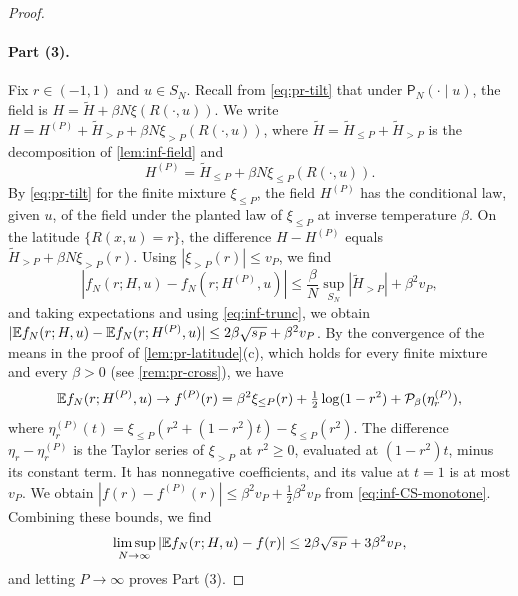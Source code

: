 \begin{proof}
\paragraph{Part (3).} Fix $r\in(-1,1)$ and $u\in S_N$. Recall from \eqref{eq:pr-tilt} that under $\mathsf P_N(\cdot\mid u)$, the field is $H=\widetilde H+\beta N\xi(R(\cdot,u))$. We write $H=H^{(P)}+\widetilde H_{>P}+\beta N\xi_{>P}(R(\cdot,u))$, where $\widetilde H=\widetilde H_{\le P}+\widetilde H_{>P}$ is the decomposition of \cref{lem:inf-field} and
\begin{equation*}
H^{(P)}=\widetilde H_{\le P}+\beta N\xi_{\le P}(R(\cdot,u)).
\end{equation*}
By \eqref{eq:pr-tilt} for the finite mixture $\xi_{\le P}$, the field $H^{(P)}$ has the conditional law, given $u$, of the field under the planted law of $\xi_{\le P}$ at inverse temperature $\beta$. On the latitude $\{R(x,u)=r\}$, the difference $H-H^{(P)}$ equals $\widetilde H_{>P}+\beta N\xi_{>P}(r)$. Using $|\xi_{>P}(r)|\le v_P$, we find
\begin{equation*}
|f_N(r;H,u)-f_N(r;H^{(P)},u)|\le\frac\beta N\sup_{S_N}|\widetilde H_{>P}|+\beta^2v_P,
\end{equation*}
and taking expectations and using \eqref{eq:inf-trunc}, we obtain $|\mathbb E f_N(r;H,u)-\mathbb E f_N(r;H^{(P)},u)|\le2\beta\sqrt{s_P}+\beta^2v_P$. By the convergence of the means in the proof of \cref{lem:pr-latitude}(c), which holds for every finite mixture and every $\beta>0$ (see \cref{rem:pr-cross}), we have
\begin{equation*}
\mathbb E f_N(r;H^{(P)},u)\to f^{(P)}(r)=\beta^2\xi_{\le P}(r)+\tfrac12\log(1-r^2)+\mathcal P_\beta(\eta^{(P)}_r),
\end{equation*}
where $\eta^{(P)}_r(t)=\xi_{\le P}(r^2+(1-r^2)t)-\xi_{\le P}(r^2)$. The difference $\eta_r-\eta_r^{(P)}$ is the Taylor series of $\xi_{>P}$ at $r^2\ge0$, evaluated at $(1-r^2)t$, minus its constant term. It has nonnegative coefficients, and its value at $t=1$ is at most $v_P$. We obtain $|f(r)-f^{(P)}(r)|\le\beta^2v_P+\frac12\beta^2v_P$ from \eqref{eq:inf-CS-monotone}. Combining these bounds, we find
\begin{equation*}
\limsup_{N\to\infty}|\mathbb E f_N(r;H,u)-f(r)|\le2\beta\sqrt{s_P}+3\beta^2v_P,
\end{equation*}
and letting $P\to\infty$ proves Part (3).


\end{proof}
